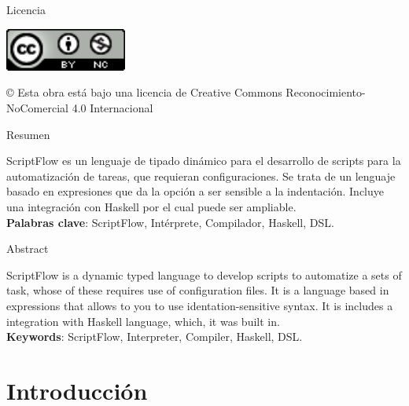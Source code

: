 \documentclass[11pt]{article}
\begin{document}
\newpage
\begin{flushleft}
  {\huge  Licencia }\\[2ex]
\end{flushleft}

\begin{center}
  \includegraphics[width=40mm]{license.png}\\[4ex]
\end{center}
© Esta obra está bajo una licencia de Creative Commons Reconocimiento-NoComercial 4.0 Internacional

\newpage
\begin{center}
  {\huge  Resumen }\\[2ex]
\end{center}

{\fontsize{14}{11}\selectfont
   ScriptFlow es un lenguaje de tipado dinámico para el desarrollo de scripts para la automatización de tareas, que requieran configuraciones.
   Se trata de un lenguaje basado en expresiones que da la opción a ser sensible a la indentación. Incluye una integración con Haskell por el
   cual puede ser ampliable.
}\\
\vspace{50mm}
\textbf{Palabras clave}: ScriptFlow, Intérprete, Compilador, Haskell, DSL.

\newpage
\begin{center}
  {\huge  Abstract }\\[2ex]
\end{center}

{\fontsize{14}{11}\selectfont
   ScriptFlow is a dynamic typed language to develop scripts to automatize a sets of task, whose of these requires use of configuration files.
   It is a language based in expressions that allows to you to use identation-sensitive syntax. It is includes a integration with Haskell language,
   which, it was built in.
}\\
\vspace{50mm}
\textbf{Keywords}: ScriptFlow, Interpreter, Compiler, Haskell, DSL.

\newpage

\renewcommand{\contentsname}{Índice general}

\tableofcontents

\newpage


\section{Introducción}
\label{sec:orgd1baae3}
\end{document}
